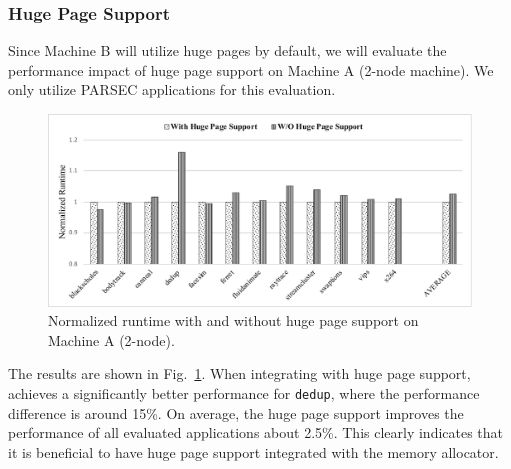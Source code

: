 \subsubsection{Huge Page Support} 
Since Machine B will utilize huge pages by default, we will evaluate the performance impact of huge page support on Machine A (2-node machine). We only utilize PARSEC applications for this evaluation. 

\begin{figure}[!h]
    \centering
    \includegraphics[width=\textwidth]{figure/hugepage.pdf}
    \caption{Normalized runtime with and without huge page support on Machine A (2-node).}
    \label{fig:hugepage}
\end{figure}

The results are shown in Fig.~\ref{fig:hugepage}. When integrating with huge page support, \NM{} achieves a significantly better performance for \texttt{dedup}, where the performance difference is around 15\%. On average,  the huge page support improves the performance of all evaluated applications about 2.5\%. This clearly indicates that it is beneficial to have huge page support integrated with the memory allocator.  


